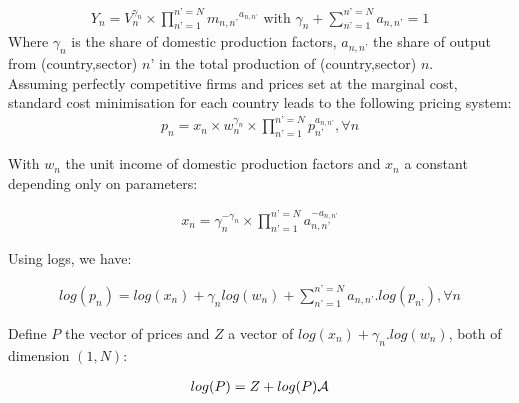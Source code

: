 \documentclass[11pt,a4paper]{paper} %
\begin{document}
\begin{eqnarray*}
Y_n=V^{\gamma_n}_n \times \prod_{n’=1}^{n’=N} {m_{n,n’}}^{a_{n,n’}} \text{ with } \gamma_n +\sum_{n’=1}^{n’=N} {a_{n,n’}} =1
\end{eqnarray*}
Where $\gamma_n$ is the share of domestic production factors, $a_{n,n’}$ the share of output from (country,sector) $n’$ in the total production of (country,sector) $n$. \\ 
Assuming perfectly competitive firms and prices set at the marginal cost, standard cost minimisation for each country leads to the following pricing system:
\begin{eqnarray*}
	p_n=x_n \times w_n^{\gamma_n} \times \prod_{n’=1}^{n’=N}p_{n’}^{a_{n,n’}}, \forall n 
\end{eqnarray*}

With $w_n$ the unit income of domestic production factors and $x_n$ a constant depending only on parameters:

\begin{eqnarray*}
	x_n=\gamma_n^{-\gamma_n} \times \prod_{n’=1}^{n’=N}a_{n,n’}^{-a_{n,n’}}
\end{eqnarray*}

Using logs, we have:

\begin{eqnarray*}
	log(p_n) = log(x_n) + \gamma_n log(w_n) + \sum_{n’=1}^{n’=N}a_{n,n’}.log(p_{n’}), \forall n
\end{eqnarray*}

Define $P$ the vector of prices and $Z$ a vector of $log(x_n)+\gamma_n.log(w_n)$, both of dimension $(1,N)$: 

\begin{eqnarray}
	log(P)=Z + log(P){\cal A}
	\label{eq:priceequation} 
\end{eqnarray}
\end{document}
